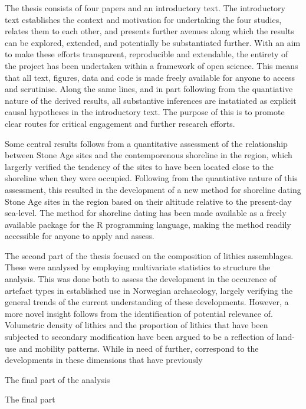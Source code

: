 The thesis consists of four papers and an introductory text. The introductory text establishes the context and motivation for undertaking the four studies, relates them to each other, and presents further avenues along which the results can be explored, extended, and potentially be substantiated further. With an aim to make these efforts transparent, reproducible and extendable, the entirety of the project has been undertaken within a framework of open science. This means that all text, figures, data and code is made freely available for anyone to access and scrutinise. Along the same lines, and in part following from the quantiative nature of the derived results, all substantive inferences are instatiated as explicit causal hypotheses in the introductory text. The purpose of this is to promote clear routes for critical engagement and further research efforts.  

Some central results follows from a quantitative assessment of the relationship between Stone Age sites and the contemporenous shoreline in the region,  which largerly verified the tendency of the sites to have been located close to the shoreline when they were occupied. Following from the quantiative nature of this assessment, this resulted in the development of a new method for shoreline dating Stone Age sites in the region based on their altitude relative to the present-day sea-level. The method for shoreline dating has been made available as a freely available package for the R programming language, making the method readily accessible for anyone to apply and assess. 

The second part of the thesis focused on the composition of lithics assemblages. These were analysed by employing multivariate statistics to structure the analysis. This was done both to assess the development in the occurence of artefact types in established use in Norwegian archaeology, largely verifying the general trends of the current understanding of these developments. However, a more novel insight follows from the identification of potential relevance of. Volumetric density of lithics and the proportion of lithics that have been subjected to secondary modification have been argued to be a reflection of land-use and mobility patterns. While in need of further, correspond to the developments in these dimensions that have previously

The final part of the analysis 

The final part 

\tableofcontents

